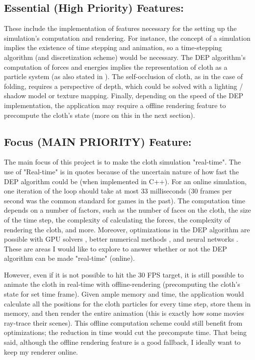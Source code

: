 \documentclass[letterpaper, 10 pt, conference, english]{ieeeconf}  %
\begin{document}
        \subsection*{Essential (High Priority) Features:}
                These include the implementation of features necessary for the setting up the simulation's computation and rendering. For instance, the concept of a simulation implies the existence of time stepping and animation, so a time-stepping algorithm (and discretization scheme) would be necessary. The DEP algorithm's computation of forces and energies implies the representation of cloth as a particle system (as also stated in \cite{baraff1998large}). The self-occlusion of cloth, as in the case of folding, requires a perspective of depth, which could be solved with a lighting / shadow model or texture mapping. Finally, depending on the speed of the DEP implementation, the application may require a offline rendering feature to precompute the cloth's state (more on this in the next section).

        \subsection*{Focus (MAIN PRIORITY) Feature:}
                The main focus of this project is to make the cloth simulation "real-time". The use of "Real-time" is in quotes because of the uncertain nature of how fast the DEP algorithm could be (when implemented in C++). For an online simulation, one iteration of the loop should take at most 33 milliseconds (30 frames per second was the common standard for games in the past). The computation time depends on a number of factors, such as the number of faces on the cloth, the size of the time step, the complexity of calculating the forces, the complexity of rendering the cloth, and more. Moreover, optimizations in the DEP algorithm are possible with GPU solvers \cite{bolz2003sparse}, better numerical methods \cite{Tamstorf2013discrete}, and neural networks \cite{bertiche2022neural}. These are areas I would like to explore to answer whether or not the DEP algorithm can be made "real-time" (online).

                However, even if it is not possible to hit the 30 FPS target, it is still possible to animate the cloth in real-time with offline-rendering (precomputing the cloth's state for set time frame). Given ample memory and time, the application would calculate all the positions for the cloth particles for every time step, store them in memory, and then render the entire animation (this is exactly how some movies ray-trace their scenes). This offline computation scheme could still benefit from optimizations; the reduction in time would cut the precompute time. That being said, although the offline rendering feature is a good fallback, I ideally want to keep my renderer online.
\end{document}
